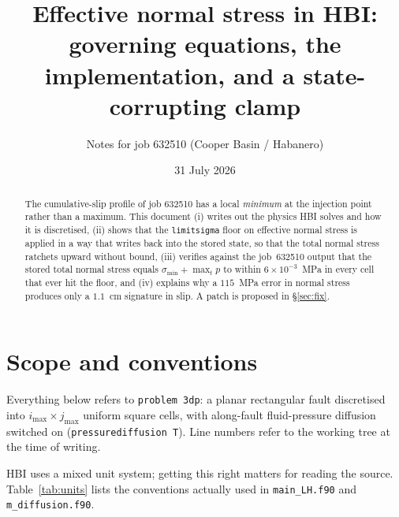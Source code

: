 \documentclass[11pt]{article}
\title{Effective normal stress in HBI: governing equations, the\\
       \code{limitsigma} implementation, and a state-corrupting clamp}
\author{Notes for job 632510 (Cooper Basin / Habanero)}
\date{31 July 2026}
\newcommand{\code}[1]{\texttt{#1}}
\begin{document}
\sloppy
\maketitle

\begin{abstract}
\noindent
The cumulative-slip profile of job 632510 has a local \emph{minimum} at the
injection point rather than a maximum. This document (i) writes out the
physics HBI solves and how it is discretised, (ii) shows that the
\code{limitsigma} floor on effective normal stress is applied in a way that
writes back into the stored state, so that the total normal stress ratchets
upward without bound, (iii) verifies against the job~632510 output that the
stored total normal stress equals $\sigma_{\min}+\max_t p$ to within
$6\times10^{-3}$~MPa in every cell that ever hit the floor, and (iv) explains
why a $115$~MPa error in normal stress produces only a $1.1$~cm signature in
slip. A patch is proposed in \S\ref{sec:fix}.
\end{abstract}

\tableofcontents

\section{Scope and conventions}

Everything below refers to \code{problem 3dp}: a planar rectangular fault
discretised into $i_{\max}\times j_{\max}$ uniform square cells, with
along-fault fluid-pressure diffusion switched on
(\code{pressurediffusion T}). Line numbers refer to the working tree at the
time of writing.

HBI uses a mixed unit system; getting this right matters for reading the
source. Table~\ref{tab:units} lists the conventions actually used in
\code{main\_LH.f90} and \code{m\_diffusion.f90}.
\end{document}
